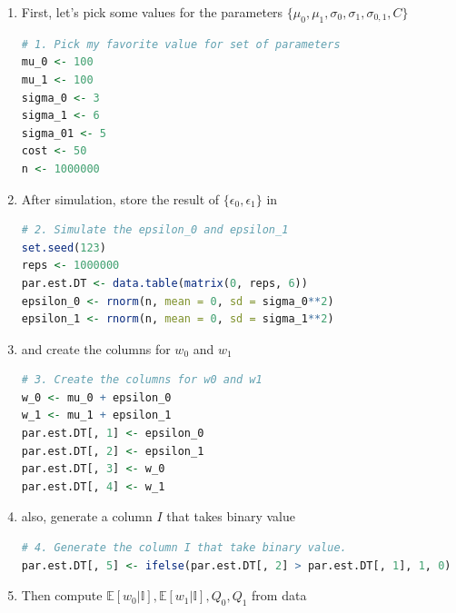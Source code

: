 \documentclass[11pt]{article}
\newcommand{\ept}{\mathbb{E}}
\begin{document}
        \begin{enumerate}

            \item First, let's pick some values for the parameters $\{\mu_0, \mu_1, \sigma_0, \sigma_1, \sigma_{0, 1}, C\}$
            
                \begin{lstlisting}[language=R]
# 1. Pick my favorite value for set of parameters
mu_0 <- 100
mu_1 <- 100
sigma_0 <- 3
sigma_1 <- 6
sigma_01 <- 5
cost <- 50
n <- 1000000
                \end{lstlisting}

            \item After simulation, store the result of $\{\epsilon_0, \epsilon_1\}$ in 
           
                \begin{lstlisting}[language=R]
# 2. Simulate the epsilon_0 and epsilon_1
set.seed(123)
reps <- 1000000
par.est.DT <- data.table(matrix(0, reps, 6))
epsilon_0 <- rnorm(n, mean = 0, sd = sigma_0**2)
epsilon_1 <- rnorm(n, mean = 0, sd = sigma_1**2)
                \end{lstlisting}
            
            \item and create the columns for $w_0$ and $w_1$
            
                \begin{lstlisting}[language=R]
# 3. Create the columns for w0 and w1
w_0 <- mu_0 + epsilon_0
w_1 <- mu_1 + epsilon_1
par.est.DT[, 1] <- epsilon_0
par.est.DT[, 2] <- epsilon_1
par.est.DT[, 3] <- w_0
par.est.DT[, 4] <- w_1
                \end{lstlisting}

            \item also, generate a column $I$ that takes binary value
            
                \begin{lstlisting}[language=R]
# 4. Generate the column I that take binary value.
par.est.DT[, 5] <- ifelse(par.est.DT[, 2] > par.est.DT[, 1], 1, 0)
                \end{lstlisting}

            \item Then compute $\ept[w_0 | \mathbb{I}], \ept[w_1 | \mathbb{I}], Q_0, Q_1$ from data
            

\end{enumerate}
\end{document}
